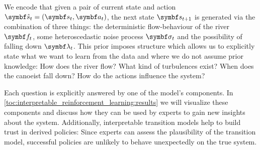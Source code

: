 We encode that given a pair of current state and action $\mat{\hat{s}}_t = \left( \mat{s}_t, \mat{a}_t \right)$, the next state $\mat{s}_{t+1}$ is generated via the combination of three things:
the deterministic flow-behaviour of the river $\mat{f}_t$, some heteroscedastic noise process $\mat{\sigma}_t$ and the possibility of falling down $\mat{\lambda}_t$.
This prior imposes structure which allows us to explicitly state what we want to learn from the data and where we do not assume prior knowledge:
How does the river flow?
What kind of turbulences exist?
When does the canoeist fall down?
How do the actions influence the system?

Each question is explicitly answered by one of the model's components.
In \cref{toc:interpretable_reinforcement_learning:results} we will visualize these components and discuss how they can be used by experts to gain new insights about the system.
Additionally, interpretable transition models help to build trust in derived policies:
Since experts can assess the plausibility of the transition model, successful policies are unlikely to behave unexpectedly on the true system.

